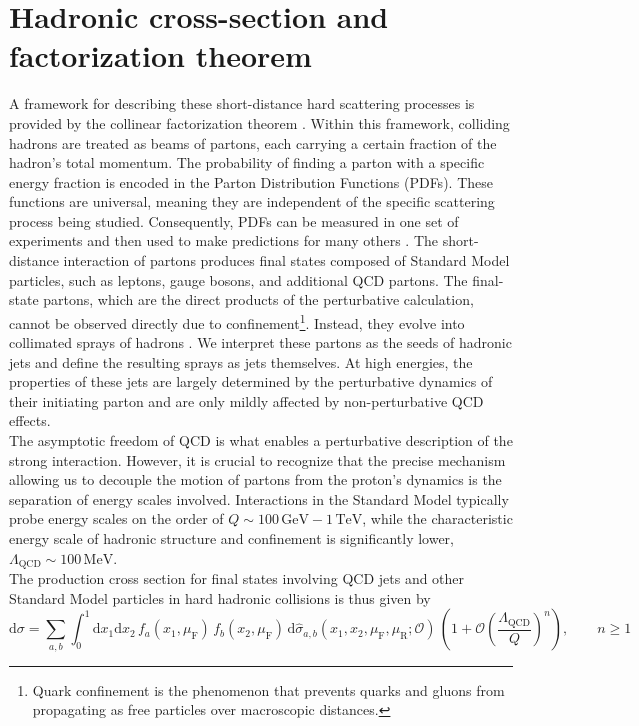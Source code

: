 \documentclass[a4paper, 12pt]{book}
\begin{document}
\section{Hadronic cross-section and factorization theorem}
A framework for describing these short-distance hard scattering processes is provided by the collinear factorization theorem \cite{Collins:1987pm}. Within this framework, colliding hadrons are treated as beams of partons, each carrying a certain fraction of the hadron's total momentum. The probability of finding a parton with a specific energy fraction is encoded in the Parton Distribution Functions (PDFs). These functions are universal, meaning they are independent of the specific scattering process being studied. Consequently, PDFs can be measured in one set of experiments and then used to make predictions for many others \cite{Melnikov2018}. The short-distance interaction of partons produces final states composed of Standard Model particles, such as leptons, gauge bosons, and additional QCD partons. The final-state partons, which are the direct products of the perturbative calculation, cannot be observed directly due to confinement\footnote{Quark confinement is the phenomenon that prevents quarks and gluons from propagating as free particles over macroscopic distances.}. Instead, they evolve into collimated sprays of hadrons \cite{Salam:2010nqg}. We interpret these partons as the seeds of hadronic jets and define the resulting sprays as jets themselves. At high energies, the properties of these jets are largely determined by the perturbative dynamics of their initiating parton and are only mildly affected by non-perturbative QCD effects. \\
The asymptotic freedom of QCD is what enables a perturbative description of the strong interaction. However, it is crucial to recognize that the precise mechanism allowing us to decouple the motion of partons from the proton's dynamics is the separation of energy scales involved. Interactions in the Standard Model typically probe energy scales on the order of $Q \sim 100  \, \text{GeV} - 1 \, \text{TeV}$, while the characteristic energy scale of hadronic structure and confinement is significantly lower, $\Lambda_{\text{QCD}} \sim 100 \, \text{MeV}$. \\
The production cross section for final states involving QCD jets and other Standard Model particles in hard hadronic collisions is thus given by
\begin{equation}
    \text{d}\sigma = \sum_{a, b} \int_0^1 \text{d}x_1 \text{d}x_2 \, f_{a}(x_1, \mu_\text{F}) \, f_{b}(x_2,\mu_\text{F}) \, \text{d}\hat \sigma_{a,b}(x_1,x_2,\mu_\text{F},\mu_\text{R};\mathcal{O}) \, \left(1+ \mathcal{O}\left(\frac{\Lambda_{\text{QCD}}}{Q} \right)^n \right), \qquad n\geq1
    \label{fact-theor}
\end{equation}
\end{document}
